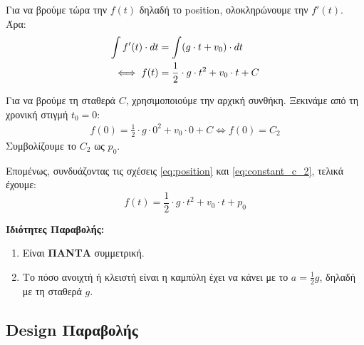 \documentclass[11pt,a4paper]{article}
\begin{document}
Για να βρούμε τώρα την $f(t)$ δηλαδή το position, ολοκληρώνουμε την $f'(t)$.
Άρα:
\begin{align}
    \int f'(t)\cdot dt &= \int (g \cdot t +v_0)\cdot dt \notag \\
    \iff f(t) &= \frac{1}{2}\cdot g\cdot t^2 + v_0\cdot t + C \label{eq:position}
\end{align}

\vspace{5pt}
Για να βρούμε τη σταθερά $C$, χρησιμοποιούμε την αρχική συνθήκη.
Ξεκινάμε από τη χρονική στιγμή $t_0 = 0$:
\begin{align}
    f(0) = \frac{1}{2}\cdot g \cdot 0^2 + v_0 \cdot 0 + C \iff f(0) = C_2 \label{eq:constant_c_2}
\end{align}
Συμβολίζουμε το $C_2$ ως $p_0$.

Επομένως, συνδυάζοντας τις σχέσεις \eqref{eq:position} και \eqref{eq:constant_c_2}, τελικά έχουμε:
\begin{equation*}
    f(t) = \frac{1}{2}\cdot g \cdot t^2 + v_0 \cdot t + p_0 
\end{equation*}

\begin{center}
\end{center}

\bigskip
\textbf{Ιδιότητες Παραβολής:}
\begin{enumerate}
    \item Είναι \textbf{ΠΑΝΤΑ} συμμετρική.
    \item Το πόσο ανοιχτή ή κλειστή είναι η καμπύλη έχει να κάνει με το $a=\frac{1}{2}g$, δηλαδή με τη σταθερά $g$.
\end{enumerate}

\subsection*{Design Παραβολής}
\end{document}
